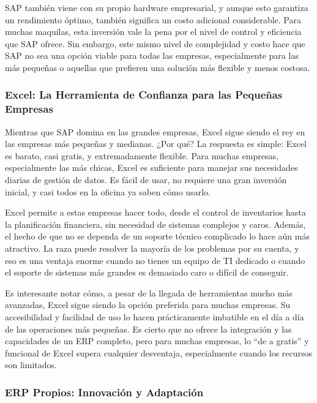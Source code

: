 \documentclass[
  letterpaper,
]{book}
\begin{document}
SAP también viene con su propio hardware empresarial, y aunque esto
garantiza un rendimiento óptimo, también significa un costo adicional
considerable. Para muchas maquilas, esta inversión vale la pena por el
nivel de control y eficiencia que SAP ofrece. Sin embargo, este mismo
nivel de complejidad y costo hace que SAP no sea una opción viable para
todas las empresas, especialmente para las más pequeñas o aquellas que
prefieren una solución más flexible y menos costosa.

\subsubsection{Excel: La Herramienta de Confianza para las Pequeñas
Empresas}\label{excel-la-herramienta-de-confianza-para-las-pequeuxf1as-empresas}

Mientras que SAP domina en las grandes empresas, Excel sigue siendo el
rey en las empresas más pequeñas y medianas. ¿Por qué? La respuesta es
simple: Excel es barato, casi gratis, y extremadamente flexible. Para
muchas empresas, especialmente las más chicas, Excel es suficiente para
manejar sus necesidades diarias de gestión de datos. Es fácil de usar,
no requiere una gran inversión inicial, y casi todos en la oficina ya
saben cómo usarlo.

Excel permite a estas empresas hacer todo, desde el control de
inventarios hasta la planificación financiera, sin necesidad de sistemas
complejos y caros. Además, el hecho de que no se dependa de un soporte
técnico complicado lo hace aún más atractivo. La raza puede resolver la
mayoría de los problemas por su cuenta, y eso es una ventaja enorme
cuando no tienes un equipo de TI dedicado o cuando el soporte de
sistemas más grandes es demasiado caro o difícil de conseguir.

Es interesante notar cómo, a pesar de la llegada de herramientas mucho
más avanzadas, Excel sigue siendo la opción preferida para muchas
empresas. Su accesibilidad y facilidad de uso lo hacen prácticamente
imbatible en el día a día de las operaciones más pequeñas. Es cierto que
no ofrece la integración y las capacidades de un ERP completo, pero para
muchas empresas, lo ``de a gratis'' y funcional de Excel supera
cualquier desventaja, especialmente cuando los recursos son limitados.

\subsubsection{ERP Propios: Innovación y
Adaptación}\label{erp-propios-innovaciuxf3n-y-adaptaciuxf3n}
\end{document}
